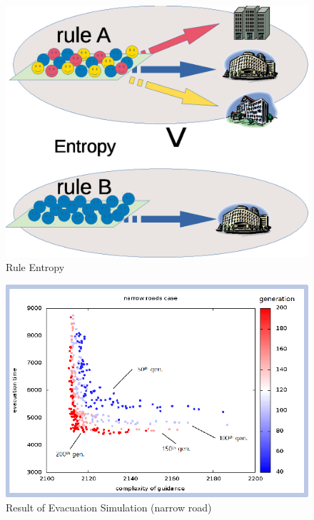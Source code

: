 \begin{figure}
  \centering
  \includegraphics[width=.8\linewidth]{Figs.noda/figure-09.evac_rule.eps}
  \caption{Rule Entropy}
  \label{fig:Figs.noda/figure-09.evac_rule.eps}
\end{figure}

\begin{figure}
  \centering
  \includegraphics[width=.8\linewidth]{Figs.noda/figure-10.evac_narrow.eps}
  \caption{Result of Evacuation Simulation (narrow road)}
  \label{fig:Figs.noda/figure-10.evac_narrow.eps}
\end{figure}

